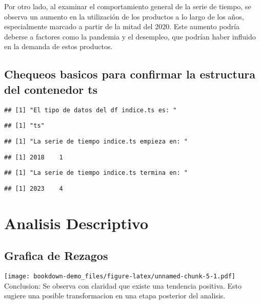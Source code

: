 \documentclass[
]{book}
\begin{document}
Por otro lado, al examinar el comportamiento general de la serie de tiempo, se observa un aumento en la utilización de los productos a lo largo de los años, especialmente marcado a partir de la mitad del 2020. Este aumento podría deberse a factores como la pandemia y el desempleo, que podrían haber influido en la demanda de estos productos.

\hypertarget{chequeos-basicos-para-confirmar-la-estructura-del-contenedor-ts}{%
\subsection{Chequeos basicos para confirmar la estructura del contenedor ts}\label{chequeos-basicos-para-confirmar-la-estructura-del-contenedor-ts}}

\begin{verbatim}
## [1] "El tipo de datos del df indice.ts es: "
\end{verbatim}

\begin{verbatim}
## [1] "ts"
\end{verbatim}

\begin{verbatim}
## [1] "La serie de tiempo indice.ts empieza en: "
\end{verbatim}

\begin{verbatim}
## [1] 2018    1
\end{verbatim}

\begin{verbatim}
## [1] "La serie de tiempo indice.ts termina en: "
\end{verbatim}

\begin{verbatim}
## [1] 2023    4
\end{verbatim}

\hypertarget{analisis-descriptivo}{%
\section{Analisis Descriptivo}\label{analisis-descriptivo}}

\hypertarget{grafica-de-rezagos}{%
\subsection{Grafica de Rezagos}\label{grafica-de-rezagos}}

\texttt{[image: bookdown-demo\_files/figure-latex/unnamed-chunk-5-1.pdf]}
Conclusion: Se observa con claridad que existe una tendencia positiva. Esto sugiere una posible transformacion en una etapa posterior del analisis.
\end{document}
